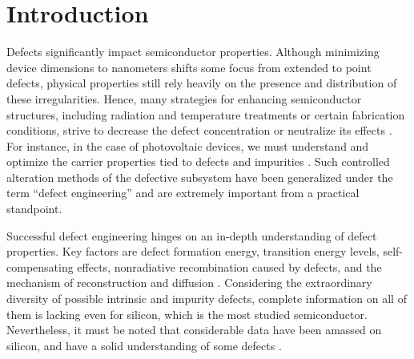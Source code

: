 \documentclass{WileyMSP-template}
\begin{document}


\section{Introduction}

Defects significantly impact semiconductor properties.
Although minimizing device dimensions to nanometers shifts some focus from extended to point defects,
physical properties still rely heavily on the presence and distribution of these irregularities.
Hence, many strategies for enhancing semiconductor structures, including radiation and temperature treatments or certain fabrication conditions, strive to decrease the defect concentration or neutralize its effects \cite{Cai2023,Vobecky2021,Frascaroli2021}.
For instance, in the case of photovoltaic devices, we must understand and optimize the carrier properties tied to defects and impurities  \cite{Cai2023}.
Such controlled alteration methods of the defective subsystem have been generalized under the term ``defect engineering'' and are extremely important from a practical standpoint.

Successful defect engineering hinges on an in-depth understanding of defect properties.
Key factors are defect formation energy, transition energy levels, self-compensating effects, nonradiative recombination caused by defects,
and the mechanism of reconstruction and diffusion  \cite{Cai2023}.
Considering the extraordinary diversity of possible intrinsic and impurity defects, complete information on all of them is lacking even for silicon, which is the most studied semiconductor.
Nevertheless, it must be noted that considerable data have been amassed on silicon, and have a solid understanding of some defects \cite{Juhl2018}.
\end{document}
